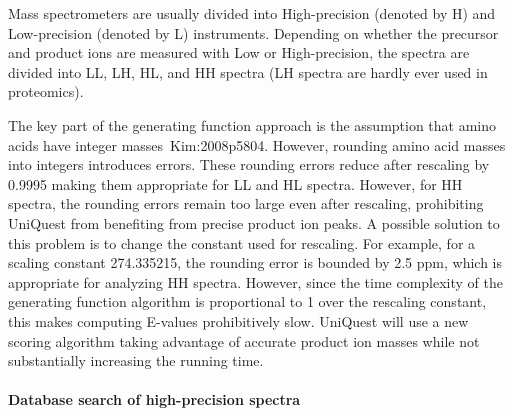 Mass spectrometers are usually divided into High-precision (denoted by H) and Low-precision (denoted by L) instruments.
Depending on whether the precursor and product ions are measured with Low or High-precision, the spectra are divided into LL, LH, HL, and HH spectra (LH spectra are hardly ever used in proteomics).

The key part of the generating function approach is the assumption that amino acids have integer masses~\cite{unv}{Kim:2008p5804}. However, rounding amino acid masses into integers introduces  errors.
These rounding errors reduce after rescaling by 0.9995 
making them appropriate for  LL and HL spectra.
However, for HH spectra, the rounding errors remain too large even after rescaling,
prohibiting UniQuest  from benefiting from precise product ion peaks. A possible
solution to this problem is to change the constant used
for rescaling. For example, for a scaling constant 274.335215,  
the rounding error is bounded by 2.5 ppm, which is appropriate for analyzing
HH spectra. However, since the time complexity of the generating function
algorithm is proportional to 1 over the rescaling constant, this makes
computing E-values prohibitively slow.
UniQuest will use a new scoring algorithm taking advantage of accurate product ion masses while not substantially increasing the running
time. 


\paragraph{Database search of high-precision spectra}

